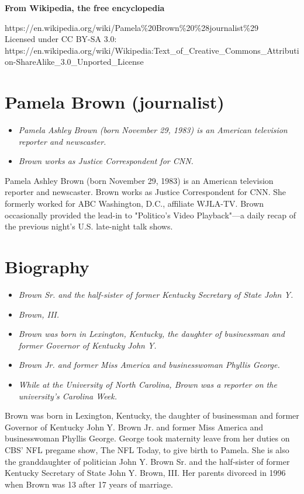 \textbf{From Wikipedia, the free encyclopedia}

https://en.wikipedia.org/wiki/Pamela\%20Brown\%20\%28journalist\%29\\
Licensed under CC BY-SA 3.0:\\
https://en.wikipedia.org/wiki/Wikipedia:Text\_of\_Creative\_Commons\_Attribution-ShareAlike\_3.0\_Unported\_License

\section{Pamela Brown (journalist)}\label{pamela-brown-journalist}

\begin{itemize}
\item
  \emph{Pamela Ashley Brown (born November 29, 1983) is an American
  television reporter and newscaster.}
\item
  \emph{Brown works as Justice Correspondent for CNN.}
\end{itemize}

Pamela Ashley Brown (born November 29, 1983) is an American television
reporter and newscaster. Brown works as Justice Correspondent for CNN.
She formerly worked for ABC Washington, D.C., affiliate WJLA-TV. Brown
occasionally provided the lead-in to "Politico's Video Playback"---a
daily recap of the previous night's U.S. late-night talk shows.

\section{Biography}\label{biography}

\begin{itemize}
\item
  \emph{Brown Sr. and the half-sister of former Kentucky Secretary of
  State John Y.}
\item
  \emph{Brown, III.}
\item
  \emph{Brown was born in Lexington, Kentucky, the daughter of
  businessman and former Governor of Kentucky John Y.}
\item
  \emph{Brown Jr. and former Miss America and businesswoman Phyllis
  George.}
\item
  \emph{While at the University of North Carolina, Brown was a reporter
  on the university's Carolina Week.}
\end{itemize}

Brown was born in Lexington, Kentucky, the daughter of businessman and
former Governor of Kentucky John Y. Brown Jr. and former Miss America
and businesswoman Phyllis George. George took maternity leave from her
duties on CBS' NFL pregame show, The NFL Today, to give birth to Pamela.
She is also the granddaughter of politician John Y. Brown Sr. and the
half-sister of former Kentucky Secretary of State John Y. Brown, III.
Her parents divorced in 1996 when Brown was 13 after 17 years of
marriage.

